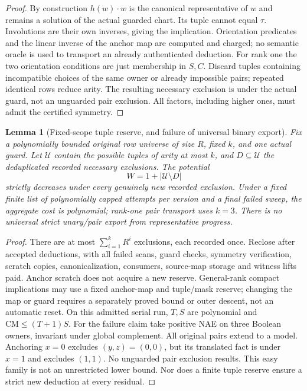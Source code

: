 \documentclass[11pt]{article}
\newtheorem{lemma}[theorem]{Lemma}
\begin{document}
\begin{proof}
By construction $h(w)\cdot w$ is the canonical representative of $w$ and remains a solution of the actual guarded chart. Its tuple cannot equal $\tau$. Involutions are their own inverses, giving the implication. Orientation predicates and the linear inverse of the anchor map are computed and charged; no semantic oracle is used to transport an already authenticated deduction. For rank one the two orientation conditions are just membership in $S,C$. Discard tuples containing incompatible choices of the same owner or already impossible pairs; repeated identical rows reduce arity. The resulting necessary exclusion is under the actual guard, not an unguarded pair exclusion. All factors, including higher ones, must admit the certified symmetry.
\end{proof}
\begin{lemma}[Fixed-scope tuple reserve, and failure of universal binary export]\label{lem:dp20-credit}
Fix a polynomially bounded original row universe of size $R$, fixed $k$, and one actual guard. Let $\mathcal U$ contain the possible tuples of arity at most $k$, and $D\subseteq\mathcal U$ the deduplicated recorded necessary exclusions. The potential
\[
 W=1+|\mathcal U\setminus D|
\]
strictly decreases under every genuinely new recorded exclusion. Under a fixed finite list of polynomially capped attempts per version and a final failed sweep, the aggregate cost is polynomial; rank-one pair transport uses $k=3$. There is no universal strict unary/pair export from representative progress.
\end{lemma}
\begin{proof}
There are at most $\sum_{i=1}^k R^i$ exclusions, each recorded once. Reclose after accepted deductions, with all failed scans, guard checks, symmetry verification, scratch copies, canonicalization, consumers, source-map storage and witness lifts paid. Anchor scratch does not acquire a new reserve. General-rank compact implications may use a fixed anchor-map and tuple/mask reserve; changing the map or guard requires a separately proved bound or outer descent, not an automatic reset. On this admitted serial run, $T,S$ are polynomial and $\mathrm{CM}\le(T+1)S$. For the failure claim take positive NAE on three Boolean owners, invariant under global complement. All original pairs extend to a model. Anchoring $x=0$ excludes $(y,z)=(0,0)$, but its translated fact is under $x=1$ and excludes $(1,1)$. No unguarded pair exclusion results. This easy family is not an unrestricted lower bound. Nor does a finite tuple reserve ensure a strict new deduction at every residual.
\end{proof}
\end{document}
